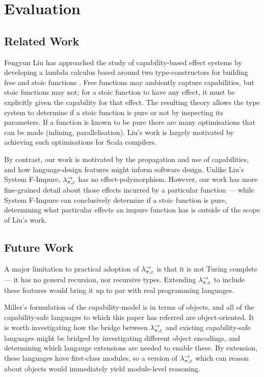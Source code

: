 
\chapter{Evaluation}

\section{Related Work}

Fengyun Liu has approached the study of capability-based effect systems by developing a lambda calculus based around two type-constructors for building free and stoic functions \cite{liu16}. Free functions may ambiently capture capabilities, but stoic functions may not; for a stoic function to have any effect, it must be explicitly given the capability for that effect. The resulting theory allows the type system to determine if a stoic function is pure or not by inspecting its parameters. If a function is known to be pure there are many optimisations that can be made (inlining, parallelisation). Liu's work is largely motivated by achieving such optimisations for Scala compilers.

By contrast, our work is motivated by the propagation and use of capabilities, and how language-design features might inform software design. Unlike Liu's System F-Impure, $\lambda^{\rightarrow}_{\pi, \varepsilon}$ has no effect-polymorphism. However, our work has more fine-grained detail about those effects incurred by a particular function --- while System F-Impure can conclusively determine if a stoic function is pure, determining what particular effects an impure function has is outside of the scope of Liu's work.

\section{Future Work}

A major limitation to practical adoption of $\lambda^{\rightarrow}_{\pi, \varepsilon}$ is that it is not Turing complete --- it has no general recursion, nor recursive types. Extending $\lambda^{\rightarrow}_{\pi, \varepsilon}$ to include these features would bring it up to par with real programming languages.

Miller's formulation of the capability-model is in terms of objects, and all of the capability-safe languages to which this paper has referred are object-oriented. It is worth investigating how the bridge between $\lambda^{\rightarrow}_{\pi, \varepsilon}$ and existing capability-safe languages might be bridged by investigating different object encodings, and determining which langauge extensions are needed to enable these. By extension, these languages have first-class modules, so a version of $\lambda^{\rightarrow}_{\pi, \varepsilon}$ which can reason about objects would immediately yield module-level reasoning.

